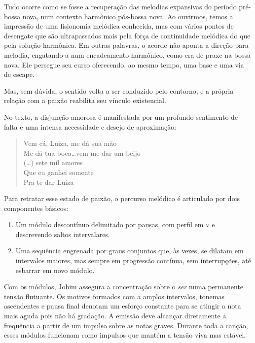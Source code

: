 Tudo ocorre como se fosse a recuperação das melodias expansivas do
período pré-bossa nova, num contexto harmônico pós-bossa nova. Ao
ouvirmos, temos a impressão de uma fisionomia melódica conhecida, mas
com vários pontos de desengate que são ultrapassados mais pela força de
continuidade melódica do que pela solução harmônica. Em outras palavras,
o acorde não aponta a direção para melodia, engatando-a num encadeamento
harmônico, como era de praxe na bossa nova. Ele persegue seu curso
oferecendo, ao mesmo tempo, uma base e uma via de escape.

Mas, sem dúvida, o sentido volta a ser conduzido pelo contorno, e a
própria relação com a paixão reabilita seu vínculo existencial.

No texto, a disjunção amorosa é manifestada por um profundo sentimento
de falta e uma intensa necessidade e desejo de aproximação:

\begin{verse}
Vem cá, Luiza, me dá sua mão\\
Me dá tua boca\ldots vem me dar um beijo\\
(\ldots) sete mil amores\\
Que eu ganhei somente\\
Pra te dar Luiza
\end{verse}

Para retratar esse estado de paixão, o percurso melódico é articulado
por dois componentes básicos: 


\begin{enumerate}
\item Um módulo descontínuo delimitado por
pausas, com perfil em \textsc{v} e descrevendo saltos intervalares.

\item Uma sequência engrenada por graus conjuntos que, às vezes, se
dilatam em intervalos maiores, mas sempre em progressão contínua, sem
interrupções, até esbarrar em novo módulo.
\end{enumerate}


Com os módulos, Jobim assegura a concentração sobre o \textit{ser} numa
permanente tensão flutuante. Os motivos formados com a amplos
intervalos, tonemas ascendentes e pausa final denotam um esforço
constante para se atingir a nota mais aguda pois não há gradação. A
emissão deve alcançar diretamente a frequência a partir de um impulso
sobre as notas graves. Durante toda a canção, esses módulos funcionam
como impulsos que mantém a tensão viva mas estável.

